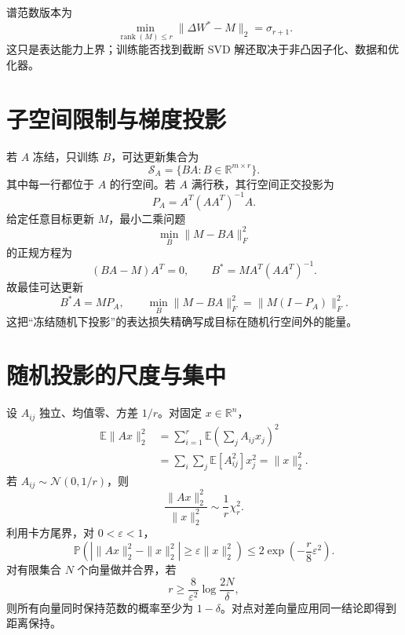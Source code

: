 \documentclass[11pt]{article}
\numberwithin{equation}{section}
\newcommand{\R}{\mathbb{R}}
\newcommand{\E}{\mathbb{E}}
\newcommand{\Pp}{\mathbb{P}}
\newcommand{\1}{\mathbf{1}}
\newcommand{\cN}{\mathcal{N}}
\newcommand{\cS}{\mathcal{S}}
\begin{document}
谱范数版本为
\begin{equation}
 \min_{\operatorname{rank}(M)\le r}\|\Delta W^*-M\|_2=\sigma_{r+1}.
\end{equation}
这只是表达能力上界；训练能否找到截断 SVD 解还取决于非凸因子化、数据和优化器。

\section{子空间限制与梯度投影}

若 $A$ 冻结，只训练 $B$，可达更新集合为
\begin{equation}
 \cS_A=\{BA:B\in\R^{m\times r}\}.
\end{equation}
其中每一行都位于 $A$ 的行空间。若 $A$ 满行秩，其行空间正交投影为
\begin{equation}
 P_A=A^T(AA^T)^{-1}A.
\end{equation}
给定任意目标更新 $M$，最小二乘问题
\begin{equation}
 \min_B\|M-BA\|_F^2
\end{equation}
的正规方程为
\begin{equation}
 (BA-M)A^T=0,\qquad
 B^*=MA^T(AA^T)^{-1}.
\end{equation}
故最佳可达更新
\begin{equation}
 B^*A=MP_A,\qquad
 \min_B\|M-BA\|_F^2=\|M(I-P_A)\|_F^2.
\end{equation}
这把“冻结随机下投影”的表达损失精确写成目标在随机行空间外的能量。

\section{随机投影的尺度与集中}

设 $A_{ij}$ 独立、均值零、方差 $1/r$。对固定 $x\in\R^n$，
\begin{align}
 \E\|Ax\|_2^2
 &=\sum_{i=1}^{r}\E\left(\sum_jA_{ij}x_j\right)^2\\
 &=\sum_i\sum_j\E[A_{ij}^2]x_j^2
 =\|x\|_2^2.
\end{align}
若 $A_{ij}\sim\cN(0,1/r)$，则
\begin{equation}
 \frac{\|Ax\|_2^2}{\|x\|_2^2}
 \sim\frac1r\chi_r^2.
\end{equation}
利用卡方尾界，对 $0<\varepsilon<1$，
\begin{equation}
 \Pp\left(
 \left|\|Ax\|_2^2-\|x\|_2^2\right|
 \ge\varepsilon\|x\|_2^2\right)
 \le2\exp\left(-\frac r8\varepsilon^2\right).
\end{equation}
对有限集合 $N$ 个向量做并合界，若
\begin{equation}
 r\ge\frac8{\varepsilon^2}\log\frac{2N}{\delta},
\end{equation}
则所有向量同时保持范数的概率至少为 $1-\delta$。对点对差向量应用同一结论即得到距离保持。
\end{document}
